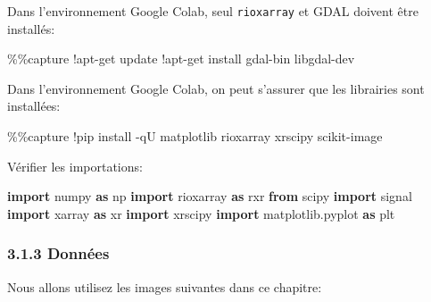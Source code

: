 \documentclass[
]{article}
\newenvironment{Shaded}{}{}
\newcommand{\BuiltInTok}[1]{\textcolor[rgb]{0.00,0.50,0.00}{#1}}
\newcommand{\ImportTok}[1]{\textcolor[rgb]{0.00,0.50,0.00}{\textbf{#1}}}
\newcommand{\NormalTok}[1]{#1}
\newcommand{\OperatorTok}[1]{\textcolor[rgb]{0.40,0.40,0.40}{#1}}
\begin{document}
Dans l'environnement Google Colab, seul \texttt{rioxarray} et GDAL
doivent être installés:

\label{88c8f020}
\label{cb1}
\begin{Shaded}
\begin{Highlighting}[]
\OperatorTok{\%\%}\NormalTok{capture}
\OperatorTok{!}\NormalTok{apt}\OperatorTok{{-}}\NormalTok{get update}
\OperatorTok{!}\NormalTok{apt}\OperatorTok{{-}}\NormalTok{get install gdal}\OperatorTok{{-}}\BuiltInTok{bin}\NormalTok{ libgdal}\OperatorTok{{-}}\NormalTok{dev}
\end{Highlighting}
\end{Shaded}

Dans l'environnement Google Colab, on peut s'assurer que les librairies
sont installées:

\label{19ef499a}
\label{cb2}
\begin{Shaded}
\begin{Highlighting}[]
\OperatorTok{\%\%}\NormalTok{capture}
\OperatorTok{!}\NormalTok{pip install }\OperatorTok{{-}}\NormalTok{qU matplotlib rioxarray xrscipy scikit}\OperatorTok{{-}}\NormalTok{image}
\end{Highlighting}
\end{Shaded}

Vérifier les importations:

\label{17c6f91c}
\label{cb3}
\begin{Shaded}
\begin{Highlighting}[]
\ImportTok{import}\NormalTok{ numpy }\ImportTok{as}\NormalTok{ np}
\ImportTok{import}\NormalTok{ rioxarray }\ImportTok{as}\NormalTok{ rxr}
\ImportTok{from}\NormalTok{ scipy }\ImportTok{import}\NormalTok{ signal}
\ImportTok{import}\NormalTok{ xarray }\ImportTok{as}\NormalTok{ xr}
\ImportTok{import}\NormalTok{ xrscipy}
\ImportTok{import}\NormalTok{ matplotlib.pyplot }\ImportTok{as}\NormalTok{ plt}
\end{Highlighting}
\end{Shaded}

\subsubsection{\texorpdfstring{{3.1.3}
Données}{3.1.3 Données}}\label{donnuxe9es}

Nous allons utilisez les images suivantes dans ce chapitre:
\end{document}
